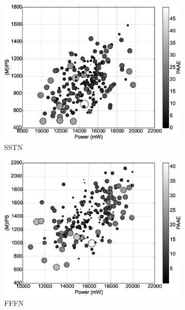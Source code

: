 \begin{figure}[tb!]
   \centering
    \begin{subfigure}{0.32\textwidth}
        \centering
        \includegraphics[width=\textwidth]{Chapter3/Figs/scatter/SSTN.eps}
        \caption{SSTN}
        \label{fig: SSTN}
    \end{subfigure}
    \begin{subfigure}{.32\textwidth}
        \centering
        \includegraphics[width=\textwidth]{Chapter3/Figs/scatter/FFFN.eps}
        \caption{FFFN}
        \label{fig: FFFN}
    \end{subfigure}
    \begin{subfigure}{0.32\textwidth}

\end{subfigure}
\end{figure}
